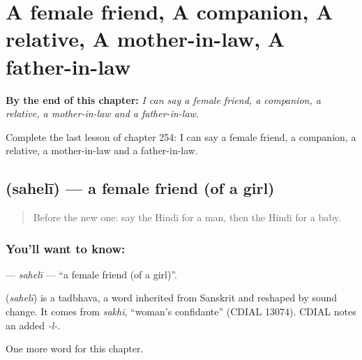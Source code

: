 
\chapter{A female friend, A companion, A relative, A mother-in-law, A father-in-law}
\label{ch:hi-a-female-friend-a-companion-a-relative-a-mother-in-law-a-father-in-law}

\begin{chapteropening}
\textbf{By the end of this chapter:} \emph{I can say a female friend, a companion, a relative, a mother-in-law and a father-in-law.}

Complete the last lesson of chapter 254: I can say a female friend, a companion, a relative, a mother-in-law and a father-in-law.
\end{chapteropening}

\section[\texorpdfstring{\hi{सहेली} (sahelī)}{सहेली (sahelī)}]{ (sahelī) — a female friend (of a girl)}

\label{lesson:HI-C254-saheli}



\begin{quote}
Before the new one: say the Hindi for a man, then the Hindi for a baby.
\end{quote}

\subsection*{You'll want to know: }
\textbf{} — \emph{sahelī} — \textquotedblleft{}a female friend (of a girl)\textquotedblright{}.

\begin{cousinweb}
\textbf{} (\emph{sahelī}) is a tadbhava, a word inherited from Sanskrit and reshaped by sound change. It comes from \emph{sakhī}, \textquotedblleft{}woman's confidante\textquotedblright{} (CDIAL 13074). CDIAL notes an added \emph{-l-}.
\end{cousinweb}

\begin{grammarlens}[title={What you've built}]
One more word for this chapter.
\end{grammarlens}

